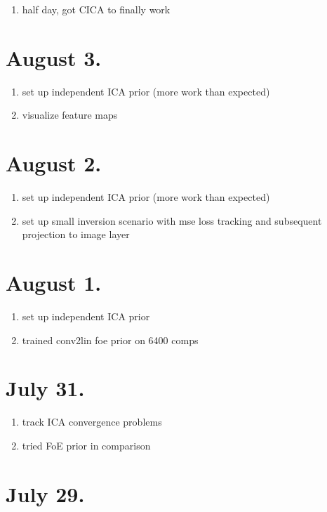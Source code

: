 \documentclass{article}
\begin{document}
\begin{enumerate}
	\item half day, got CICA to finally work
\end{enumerate}


\section*{August 3.}

\begin{enumerate}
	\item set up independent ICA prior (more work than expected)
	\item visualize feature maps
\end{enumerate}



\section*{August 2.}

\begin{enumerate}
	\item set up independent ICA prior (more work than expected)
	\item set up small inversion scenario with mse loss tracking and subsequent projection to image layer
\end{enumerate}

\section*{August 1.}

\begin{enumerate}
	\item set up independent ICA prior	
	\item trained conv2lin foe prior on 6400 comps 

\end{enumerate}


\section*{July 31.}

\begin{enumerate}
	\item track ICA convergence problems
	\item tried FoE prior in comparison
\end{enumerate}

\section*{July 29.}
\end{document}
